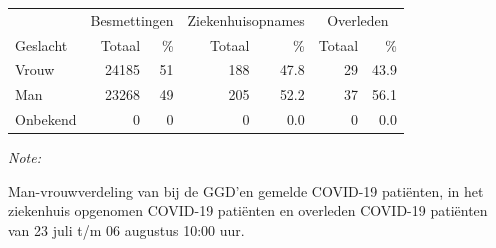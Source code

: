 \documentclass[
  english,
  man,floatsintext]{apa6}
\begin{document}
\begin{table}
\centering\begingroup\fontsize{11}{13}\selectfont

\begin{threeparttable}
\begin{tabular}{lrrrrrr}
\toprule
\multicolumn{1}{c}{ } & \multicolumn{2}{c}{Besmettingen} & \multicolumn{2}{c}{Ziekenhuisopnames} & \multicolumn{2}{c}{Overleden} \\
\cmidrule(l{3pt}r{3pt}){2-3} \cmidrule(l{3pt}r{3pt}){4-5} \cmidrule(l{3pt}r{3pt}){6-7}
Geslacht & Totaal & \% & Totaal & \% & Totaal & \%\\
\midrule
Vrouw & 24185 & 51 & 188 & 47.8 & 29 & 43.9\\
Man & 23268 & 49 & 205 & 52.2 & 37 & 56.1\\
Onbekend & 0 & 0 & 0 & 0.0 & 0 & 0.0\\
\bottomrule
\end{tabular}
\begin{tablenotes}
\item \textit{Note: } 
\item Man-vrouwverdeling van bij de GGD’en gemelde COVID-19 patiënten, in het ziekenhuis opgenomen COVID-19 patiënten en overleden COVID-19 patiënten van 23 juli t/m 06 augustus 10:00 uur.
\end{tablenotes}
\end{threeparttable}
\endgroup{}
\end{table}
\newpage
\end{document}
